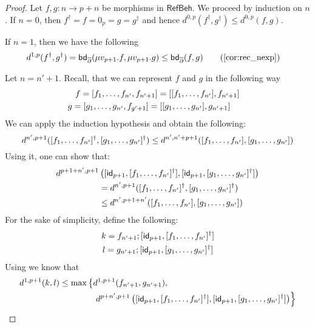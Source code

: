 \begin{proof}
	Let $f,g \colon n \to p + n$ be morphisms in $\mathsf{RefBeh}$. We proceed by induction on $n$. If $n = 0$, then $f^\dagger = f = 0_p = g = g^\dagger$ and hence $d^{0, p}(f^\dagger, g^\dagger) \leq d^{0, p}(f, g)$.
	
	If $n = 1$, then we have the following
	\begin{align*}
		d^{1,p}(f^\dagger, g^\dagger) &= \mathsf{bd}_{\overline\partial} (\mu v_{p+1}.f, \mu v_{p+1}. g)\leq \mathsf{bd}_{\overline\partial} (f, g) \tag{\Cref{cor:rec_nexp}} 
	\end{align*}
	
	Let $n = n' + 1$. Recall, that we can represent $f$ and $g$ in the following way
	\begin{gather*}
		f = [ f_1, \dots, f_{n'}, f_{n' + 1} ] = [ [ f_1, \dots, f_{n'} ] , f_{n' + 1}]\\
		g = [ g_1, \dots, g_{n'}, f_{g' + 1} ] = [ [ g_1, \dots, g_{n'} ] , g_{n' + 1}]\qquad
	\end{gather*}
	We can apply the induction hypothesis and obtain the following:
	$$
	d^{n', p + 1}([ f_1, \dots, f_{n'}]^\dagger, [ g_1, \dots, g_{n'}]^\dagger ) \leq d^{n', n' + p + 1}([ f_1, \dots, f_{n'}], [ g_1, \dots, g_{n'}] ) 
	$$
	Using it, one can show that:
	\begin{align*}
	d^{p + 1 + n' , p + 1}&\left([\mathsf{id}_{p + 1},[ f_1, \dots, f_{n'}]^\dagger ],[\mathsf{id}_{p + 1},[ g_1, \dots, g_{n'}]^\dagger] \right)\\ &=d^{n', p + 1}([ f_1, \dots, f_{n'}]^\dagger, [ g_1, \dots, g_{n'}]^\dagger)\\
	&\leq  d^{n', p + 1 + n'}([ f_1, \dots, f_{n'}], [ g_1, \dots, g_{n'}] ) 
	\end{align*}
	For the sake of simplicity, define the following:
	\begin{gather*}
	k = f_{n' + 1};[\mathsf{id}_{p + 1} ,[ f_1, \dots, f_{n'}]^\dagger]\\
	l = g_{n' + 1};[\mathsf{id}_{p + 1} ,[ g_1, \dots, g_{n'}]^\dagger]
	\end{gather*}
	Using  we know that 
	\begin{align*}
	d^{1,p+1}(k,l)&\leq \max\left\{d^{1,p + 1}(f_{n' + 1},g_{n' + 1}),\right.\\&\qquad\qquad\left. d^{p + n', p + 1}\left(\lc\id_{p + 1} ,\lc f_1, \dots, f_{n'}\rc^\dagger\rc,\lc\id_{p + 1} ,\lc g_1, \dots, g_{n'}\rc^\dagger \rc \right) \right\}\\

\end{align*}
\end{proof}
